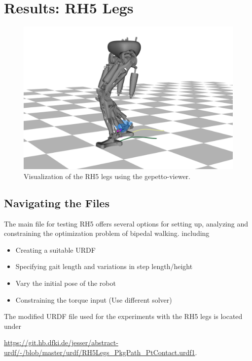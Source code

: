   
\section{Results: RH5 Legs}\label{sec:resultsRH5}
\begin{figure}[h!]
\centering
\includegraphics[width=1\linewidth]{Media/Crocoddyl/crocoddylRH5Legs.png}
\caption{Visualization of the RH5 legs using the gepetto-viewer.}
\end{figure}

\subsection{Navigating the Files}
The main file for testing RH5 offers several options for setting up, analyzing and constraining the optimization problem of bipedal walking. including
\begin{itemize}
\item Creating a suitable URDF 
\item Specifying gait length and variations in step length/height
\item Vary the initial pose of the robot
\item Constraining the torque input (Use different solver)
\end{itemize}

The modified URDF file used for the experiments with the RH5 legs is located under

\url{https://git.hb.dfki.de/jesser/abstract-urdf/-/blob/master/urdf/RH5Legs_PkgPath_PtContact.urdf1}.



